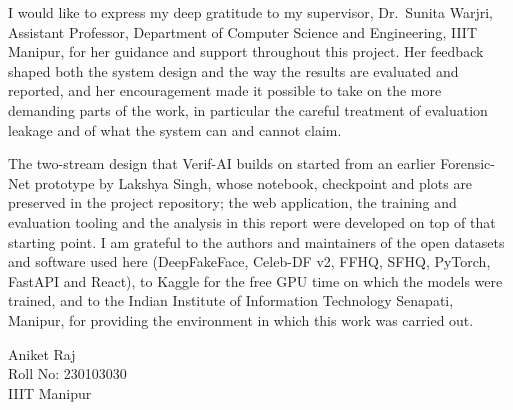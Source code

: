 I would like to express my deep gratitude to my supervisor, Dr.\ Sunita Warjri, Assistant Professor, Department of Computer Science and Engineering, IIIT Manipur, for her guidance and support throughout this project.
Her feedback shaped both the system design and the way the results are evaluated and reported, and her encouragement made it possible to
take on the more demanding parts of the work, in particular the careful treatment of evaluation leakage and of what the system can and
cannot claim.

The two-stream design that Verif-AI builds on started from an earlier Forensic-Net prototype by Lakshya Singh, whose notebook, checkpoint
and plots are preserved in the project repository; the web application, the training and evaluation tooling and the analysis in this
report were developed on top of that starting point. I am grateful to the authors and maintainers of the open datasets and software used
here (DeepFakeFace, Celeb-DF v2, FFHQ, SFHQ, PyTorch, FastAPI and React), to Kaggle for the free GPU time on which the models were
trained, and to the Indian Institute of Information Technology Senapati, Manipur, for providing the environment in which this work was carried out.

\vspace{1.5cm}
\begin{flushright}
Aniket Raj\\
Roll No: 230103030\\
IIIT Manipur
\end{flushright}
